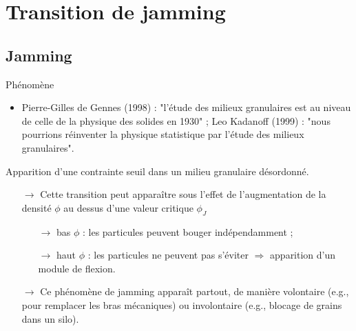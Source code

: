 \documentclass{beamer}
\begin{document}
\section{Transition de jamming}

\subsection{Jamming}

\begin{frame}{Phénomène}

\begin{itemize}
\item Pierre-Gilles de Gennes (1998) : "l’étude des milieux granulaires est au niveau de celle de la physique des solides en 1930" ; Leo Kadanoff (1999) : "nous pourrions réinventer la physique statistique par l’étude des milieux granulaires".
\end{itemize}

\begin{defi}
Apparition d’une contrainte seuil dans un milieu granulaire désordonné.
\end{defi}

\begin{itemize}
\item[$\rightarrow$] Cette transition peut apparaître sous l’effet de l’augmentation de la densité $\phi$ au dessus d’une valeur critique $\phi_J$
    \begin{itemize}
    \item[$\rightarrow$] bas $\phi$ : les particules peuvent bouger indépendamment ;
    \item[$\rightarrow$] haut $\phi$ : les particules ne peuvent pas s’éviter $\Rightarrow$ apparition d'un module de flexion.
    \end{itemize}
\item[$\rightarrow$] Ce phénomène de jamming apparaît partout, de manière volontaire (e.g., pour remplacer les bras mécaniques) ou involontaire (e.g., blocage de grains dans un silo).
\end{itemize}

\end{frame}
\end{document}
